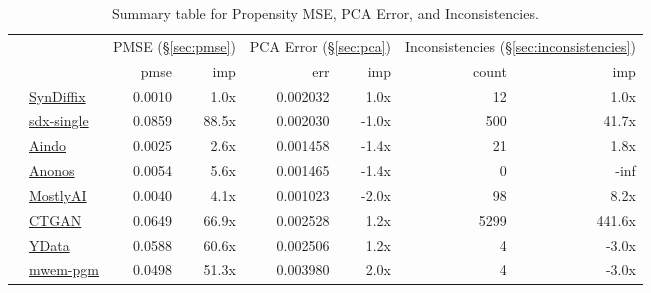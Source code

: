 \begin{table}
    \centering
    \caption{Summary table for Propensity MSE, PCA Error, and Inconsistencies.}
    \label{tab:pmse}
    \begin{tabular}{llr@{\hskip 6pt}r@{\hskip 14pt}r@{\hskip 6pt}r@{\hskip 14pt}rr}
        \toprule
          &   & \multicolumn{2}{c}{PMSE (\S\ref{sec:pmse})} & \multicolumn{2}{c}{PCA Error (\S\ref{sec:pca})} & \multicolumn{2}{c}{Inconsistencies (\S\ref{sec:inconsistencies})} \\
        
 & & pmse & imp & err & imp & count & imp \\
\midrule
        \cellcolor{blue} & \href{https://htmlpreview.github.io/?https://github.com/yoid2000/sdnist-summary/blob/main/results/syndiffix_all/report.html}{SynDiffix} & 0.0010 & 1.0x & 0.002032 & 1.0x & 12 & 1.0x \\
        \cellcolor{blue} & \href{https://htmlpreview.github.io/?https://github.com/yoid2000/sdnist-summary/blob/main/results/sdx_single/report.html}{sdx-single} & 0.0859 & 88.5x & 0.002030 & -1.0x & 500 & 41.7x \\
        \cellcolor{red} & \href{https://htmlpreview.github.io/?https://github.com/yoid2000/sdnist-summary/blob/main/results/aindo_synth/report.html}{Aindo} & 0.0025 & 2.6x & 0.001458 & -1.4x & 21 & 1.8x \\
        \cellcolor{red} & \href{https://htmlpreview.github.io/?https://github.com/yoid2000/sdnist-summary/blob/main/results/anonos_sdk/report.html}{Anonos} & 0.0054 & 5.6x & 0.001465 & -1.4x & 0 & -inf \\
        \cellcolor{red} & \href{https://htmlpreview.github.io/?https://github.com/yoid2000/sdnist-summary/blob/main/results/mostlyai_sd_platform/report.html}{MostlyAI} & 0.0040 & 4.1x & 0.001023 & -2.0x & 98 & 8.2x \\
        \cellcolor{red} & \href{https://htmlpreview.github.io/?https://github.com/yoid2000/sdnist-summary/blob/main/results/sdv_ctgan_epochs1000/report.html}{CTGAN} & 0.0649 & 66.9x & 0.002528 & 1.2x & 5299 & 441.6x \\
        \cellcolor{pink} & \href{https://htmlpreview.github.io/?https://github.com/yoid2000/sdnist-summary/blob/main/results/ydata_fabric_synthesizers/report.html}{YData} & 0.0588 & 60.6x & 0.002506 & 1.2x & 4 & -3.0x \\
        \cellcolor{ForestGreen} & \href{https://htmlpreview.github.io/?https://github.com/yoid2000/sdnist-summary/blob/main/results/mwem_pgm/report.html}{mwem-pgm} & 0.0498 & 51.3x & 0.003980 & 2.0x & 4 & -3.0x \\

\end{tabular}
\end{table}

